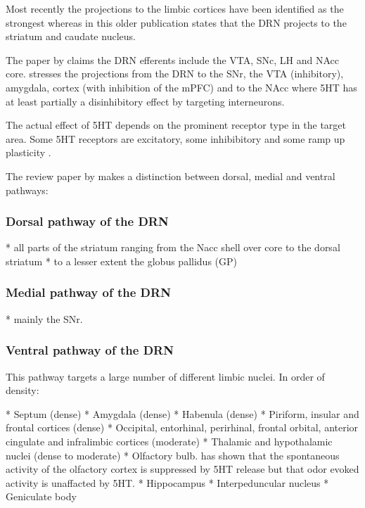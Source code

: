 \documentclass[12pt,a4paper]{article}
\begin{document}
Most recently the projections to the limbic cortices have been identified as the strongest \citep{Linley2013} \citep{Roberts2011} whereas in this older publication \citep{Reisine1984} states that the DRN projects to the striatum and caudate nucleus. 

The paper by \citep{Vertes2010} claims the DRN efferents include the VTA, SNc, LH and NAcc core. \citep{Nakamura2013} stresses the projections from the DRN to the SNr, the VTA (inhibitory), amygdala, cortex (with inhibition of the mPFC) and to the NAcc where 5HT has at least partially a disinhibitory effect by targeting interneurons.

The actual effect of 5HT depends on the prominent receptor type in the target area. Some 5HT receptors are excitatory, some inhibibitory and some ramp up plasticity \citep{Frazer1999}.

The review paper by \citep{Michelsen2007} makes a distinction between dorsal, medial and ventral pathways:

\subsubsection{Dorsal pathway of the DRN}

  * all parts of the striatum ranging from the Nacc shell over core to the dorsal striatum
  * to a lesser extent the globus pallidus (GP)

\subsubsection{Medial pathway of the DRN}

  * mainly the SNr.

\subsubsection{Ventral pathway of the DRN}

This pathway targets a large number of different limbic nuclei. In order of density:

  * Septum (dense)
  * Amygdala (dense)
  * Habenula (dense)
  * Piriform, insular and frontal cortices (dense)
  * Occipital, entorhinal, perirhinal, frontal orbital, anterior cingulate and infralimbic cortices (moderate)
  * Thalamic and hypothalamic nuclei (dense to moderate)
  * Olfactory bulb. \citep{Lottem2016} has shown that the spontaneous activity of the olfactory cortex is suppressed by 5HT release but that odor evoked activity is unaffacted by 5HT.
  * Hippocampus
  * Interpeduncular nucleus
  * Geniculate body
\end{document}
